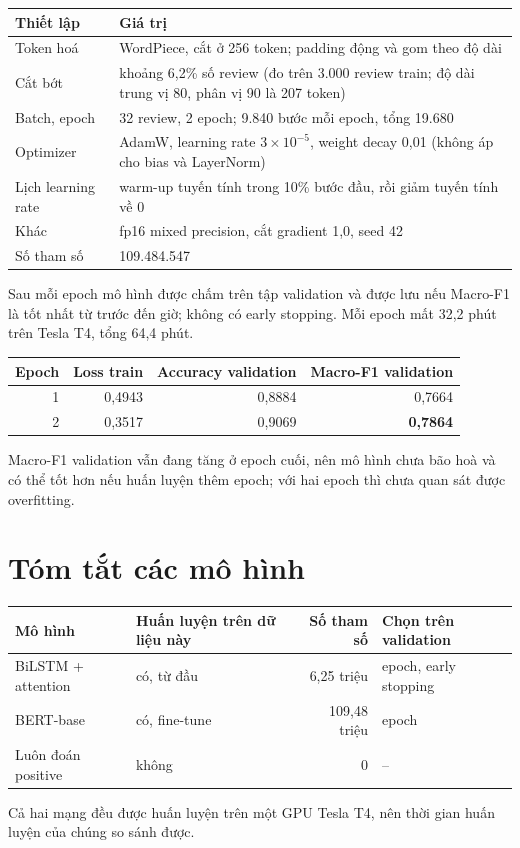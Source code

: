 \begin{center}
\begin{tabular}{@{}p{5cm}p{9cm}@{}}
    \toprule
    Thiết lập & Giá trị \\
    \midrule
    Token hoá & WordPiece, cắt ở 256 token; padding động và gom theo độ dài \\
    Cắt bớt & khoảng 6,2\% số review (đo trên 3.000 review train; độ dài trung vị 80, phân vị 90 là 207 token) \\
    Batch, epoch & 32 review, 2 epoch; 9.840 bước mỗi epoch, tổng 19.680 \\
    Optimizer & AdamW, learning rate $3\times10^{-5}$, weight decay 0,01 (không áp cho bias và LayerNorm) \\
    Lịch learning rate & warm-up tuyến tính trong 10\% bước đầu, rồi giảm tuyến tính về 0 \\
    Khác & fp16 mixed precision, cắt gradient 1,0, seed 42 \\
    Số tham số & 109.484.547 \\
    \bottomrule
\end{tabular}
\end{center}

Sau mỗi epoch mô hình được chấm trên tập validation và được lưu nếu Macro-F1 là tốt nhất từ trước đến giờ; không có early stopping. Mỗi epoch mất 32,2 phút trên Tesla T4, tổng 64,4 phút.

\begin{center}
\begin{tabular}{@{}rrrr@{}}
    \toprule
    Epoch & Loss train & Accuracy validation & Macro-F1 validation \\
    \midrule
    1 & 0,4943 & 0,8884 & 0,7664 \\
    2 & 0,3517 & 0,9069 & \textbf{0,7864} \\
    \bottomrule
\end{tabular}
\end{center}

Macro-F1 validation vẫn đang tăng ở epoch cuối, nên mô hình chưa bão hoà và có thể tốt hơn nếu huấn luyện thêm epoch; với hai epoch thì chưa quan sát được overfitting.

\section{Tóm tắt các mô hình}
\label{sec:6-7}

\begin{center}
\small
\begin{tabular}{@{}p{3.6cm}p{3.6cm}rp{3.6cm}@{}}
    \toprule
    Mô hình & Huấn luyện trên dữ liệu này & Số tham số & Chọn trên validation \\
    \midrule
    BiLSTM + attention & có, từ đầu & 6,25 triệu & epoch, early stopping \\
    BERT-base & có, fine-tune & 109,48 triệu & epoch \\
    Luôn đoán positive & không & 0 & -- \\
    \bottomrule
\end{tabular}
\end{center}

Cả hai mạng đều được huấn luyện trên một GPU Tesla T4, nên thời gian huấn luyện của chúng so sánh được.

